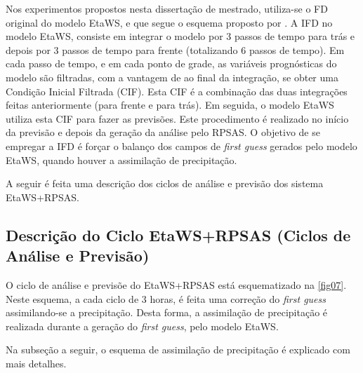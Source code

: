 Nos experimentos propostos nesta dissertação de mestrado, utiliza-se o FD original do modelo EtaWS, e que segue o esquema proposto por \cite{lynchhuang 93}. A IFD no modelo EtaWS, consiste em integrar o modelo por 3 passos de tempo para trás e depois por 3 passos de tempo para frente (totalizando 6 passos de tempo). Em cada passo de tempo, e em cada ponto de grade, as variáveis prognósticas do modelo são filtradas, com a vantagem de ao final da integração, se obter uma Condição Inicial Filtrada (CIF). Esta CIF é a combinação das duas integrações feitas anteriormente (para frente e para trás). Em seguida, o modelo EtaWS utiliza esta CIF para fazer as previsões. Este procedimento é realizado no início da previsão e depois da geração da análise pelo RPSAS. O objetivo de se empregar a IFD é forçar o balanço dos campos de \textit{first guess} gerados pelo modelo EtaWS, quando houver a assimilação de precipitação.

A seguir é feita uma descrição dos ciclos de análise e previsão dos sistema EtaWS+RPSAS.

\subsection{Descrição do Ciclo EtaWS+RPSAS (Ciclos de Análise e Previsão)}

O ciclo de análise e previsõe do EtaWS+RPSAS está esquematizado na \autoref{fig07}. Neste esquema, a cada ciclo de 3 horas, é feita uma correção do \textit{first guess} assimilando-se a precipitação. Desta forma, a assimilação de precipitação é realizada durante a geração do \textit{first guess}, pelo modelo EtaWS. 

Na subseção a seguir, o esquema de assimilação de precipitação é explicado com mais detalhes.

